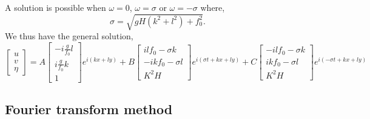\documentclass[11pt]{amsart}
\begin{document}
A solution is possible when $\omega=0$, $\omega=\sigma$ or $\omega=-\sigma$ where,
\begin{equation}
\sigma = \sqrt{ gH (k^2 + l^2) + f_0^2 }.
\end{equation}
We thus have the general solution,
\begin{equation}
\left[\begin{array}{c}u \\v \\ \eta\end{array}\right] =
A \left[\begin{array}{c} -i \frac{g}{f_0} l \\ i \frac{g}{f_0} k \\ 1 \end{array}\right] e^{i(kx + ly)} +
 B \left[\begin{array}{c} i l f_0 - \sigma k \\ -ikf_0-\sigma l \\ K^2 H \end{array}\right] e^{i( \sigma t + kx + ly)}
 +  C \left[\begin{array}{c} - i l f_0 - \sigma k \\ ikf_0-\sigma l \\ K^2 H \end{array}\right] e^{i( - \sigma t + kx + ly)}
\end{equation}

%
\subsection{Fourier transform method}
%
\end{document}
